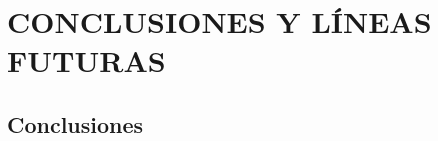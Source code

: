 \section{CONCLUSIONES Y LÍNEAS FUTURAS}\label{cap:conclusionesANDlineasfuturas}

\subsection{Conclusiones}\label{sec:conclusiones}

